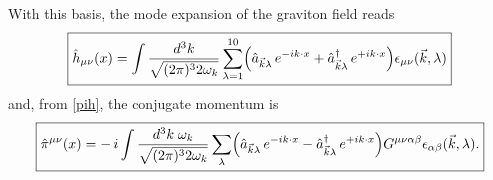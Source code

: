 \documentclass[12pt,a4paper,oneside]{article}
\numberwithin{equation}{section}   %
\begin{document}
With this basis, the mode expansion of the graviton field reads
\begin{equation}
\boxed{
  \hat{h}_{\mu\nu}(x)
  = \int \frac{d^3k}{\sqrt{(2\pi)^3 2\omega_k}}
    \sum_{\lambda=1}^{10}
    \Bigl(
      \hat{a}_{\vec{k}\lambda}\, e^{-ik\cdot x}
      + \hat{a}^{\dagger}_{\vec{k}\lambda}\, e^{+ik\cdot x}
    \Bigr)\epsilon_{\mu\nu}(\vec{k},\lambda)
}
\label{eq:modes}
\end{equation}
and, from \eqref{pih}, the conjugate momentum is
\begin{equation}
\boxed{
  \hat{\pi}^{\mu\nu}(x)
  = -\,i\int \frac{d^3k\;\omega_k}{\sqrt{(2\pi)^3 2\omega_k}}
    \sum_{\lambda}
    \Bigl(
      \hat{a}_{\vec{k}\lambda}\, e^{-ik\cdot x}
      - \hat{a}^{\dagger}_{\vec{k}\lambda}\, e^{+ik\cdot x}
    \Bigr)G^{\mu\nu\alpha\beta}\epsilon_{\alpha\beta}(\vec{k},\lambda) .
}
\label{eq:momenta}
\end{equation}
\end{document}
